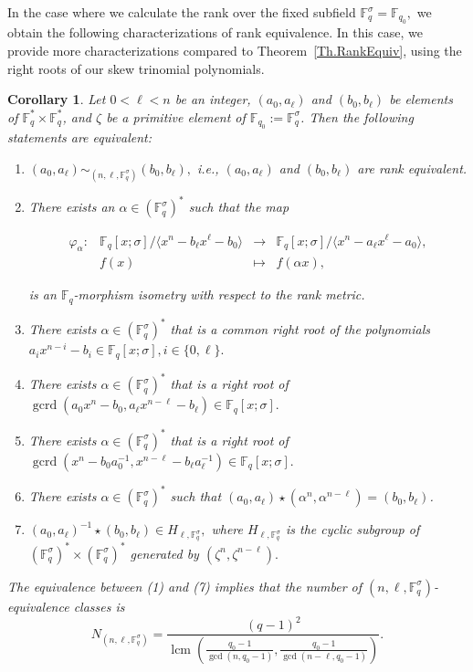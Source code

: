 \documentclass[12pt,paper]{article}
\theoremstyle{plain}
\newtheorem{corollary}[theorem]{Corollary}
\newcommand{\Fq}{\mathbb{F}_{q}}
\DeclareMathOperator{\lcm}{lcm}
\DeclareMathOperator{\gcrd}{gcrd}
\begin{document}
In the case where we calculate the rank over the fixed subfield $ \mathbb{F}_q^{\sigma} = \mathbb{F}_{q_0}, $ we obtain the following characterizations of rank equivalence. In this case, we provide more characterizations compared to Theorem~\ref{Th.RankEquiv}, using the right roots of our skew trinomial polynomials.

\begin{corollary} \label{Th.1FqSigma} 
Let $0<\ell<n$ be an integer,  $(a_0, a_{\ell})$ and $(b_0, b_{\ell})$ be elements of $\mathbb{F}_q^{*} \times \mathbb{F}_q^{*}$,  and  
$\zeta$ be  a primitive element of $\mathbb{F}_{q_0}:=\Fq^{\sigma}$. 
Then the following statements are equivalent:
\begin{enumerate}
    \item   $ (a_0, a_{\ell})  \sim_{( n,\ell, \Fq^{\sigma})} (b_0, b_{\ell}) ,$ i.e.,  $(a_0, a_{\ell}) $ and $ (b_0, b_{\ell})$ are rank equivalent. 
    \item There exists an $\alpha \in (\mathbb{F}_q^{\sigma})^*$ such that the map

  \begin{equation}
  	\begin{array}{cccc}
  	\varphi_{\alpha}:& \mathbb{F}_q[x;\sigma] /\langle x^n-b_{\ell}x^{\ell}-b_0 \rangle  &\longrightarrow & \mathbb{F}_q[x;\sigma] /\langle x^n-a_{\ell} x^{\ell}-a_0 \rangle, \\ 
  	& f(x) & \longmapsto &  f(\alpha x),
  	\end{array}
  	\end{equation} 
    
is an  $\mathbb{F}_q$-morphism isometry with respect to the rank metric.

    \item  There exists $\alpha\in (\Fq^{\sigma})^* $ that is  a common right  root of the polynomials  $\displaystyle a_i x^{n-i } - b_i \in \Fq[x;\sigma], i \in \{0,\ell\}. $ 

    \item   There exists $\alpha\in (\Fq^{\sigma})^* $ that is a right root of  $\gcrd(a_0 x^n - b_0, a_{\ell} x^{n - \ell} - b_{\ell}) \in \Fq[x;\sigma].$
       \item There exists $\alpha\in (\Fq^{\sigma})^* $ that is a right root of $\gcrd(x^n - b_0 a_0^{-1}, x^{n - \ell} - b_{\ell} a_{\ell}^{-1})\in \Fq[x;\sigma] .$ 
     \item  There exists $\alpha\in (\mathbb{F}_q^{\sigma})^* $ such that $ (a_0,a_{\ell})\star ( \alpha^n,   \alpha^{n-\ell})= (b_0,b_{\ell}) $.

     
      \item  $ (a_0, a_{\ell})^{-1} \star(b_0,b_{\ell})\in H_{\ell,\Fq^{\sigma}},$ where   $ H_{\ell,\Fq^{\sigma}}$ is the cyclic subgroup of $ (\Fq^{\sigma})^*\times (\Fq^{\sigma})^*$ generated by $(\zeta^n,\zeta^{n-\ell}) .$
\end{enumerate}
The equivalence between (1) and (7) implies that the number of $(n,\ell,\Fq^{\sigma})$-equivalence classes is $$ 
N_{(n,\ell,\Fq^{\sigma})}=\dfrac{ (q-1)^2}{ \lcm(\frac{q_0-1}{ \gcd(n,q_0-1)}, \frac{q_0-1}{ \gcd(n-\ell,q_0-1)})} .$$
\end{corollary}
\end{document}

